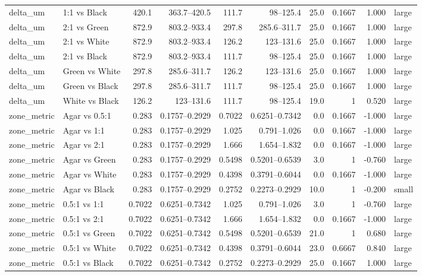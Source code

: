 \begin{longtable}{ll rr rr rrr l}
delta_um & 1:1 vs Black & 420.1 & 363.7–420.5 & 111.7 & 98–125.4 & 25.0 & 0.1667 & 1.000 & large \\
delta_um & 2:1 vs Green & 872.9 & 803.2–933.4 & 297.8 & 285.6–311.7 & 25.0 & 0.1667 & 1.000 & large \\
delta_um & 2:1 vs White & 872.9 & 803.2–933.4 & 126.2 & 123–131.6 & 25.0 & 0.1667 & 1.000 & large \\
delta_um & 2:1 vs Black & 872.9 & 803.2–933.4 & 111.7 & 98–125.4 & 25.0 & 0.1667 & 1.000 & large \\
delta_um & Green vs White & 297.8 & 285.6–311.7 & 126.2 & 123–131.6 & 25.0 & 0.1667 & 1.000 & large \\
delta_um & Green vs Black & 297.8 & 285.6–311.7 & 111.7 & 98–125.4 & 25.0 & 0.1667 & 1.000 & large \\
delta_um & White vs Black & 126.2 & 123–131.6 & 111.7 & 98–125.4 & 19.0 & 1 & 0.520 & large \\
zone_metric & Agar vs 0.5:1 & 0.283 & 0.1757–0.2929 & 0.7022 & 0.6251–0.7342 & 0.0 & 0.1667 & -1.000 & large \\
zone_metric & Agar vs 1:1 & 0.283 & 0.1757–0.2929 & 1.025 & 0.791–1.026 & 0.0 & 0.1667 & -1.000 & large \\
zone_metric & Agar vs 2:1 & 0.283 & 0.1757–0.2929 & 1.666 & 1.654–1.832 & 0.0 & 0.1667 & -1.000 & large \\
zone_metric & Agar vs Green & 0.283 & 0.1757–0.2929 & 0.5498 & 0.5201–0.6539 & 3.0 & 1 & -0.760 & large \\
zone_metric & Agar vs White & 0.283 & 0.1757–0.2929 & 0.4398 & 0.3791–0.6044 & 0.0 & 0.1667 & -1.000 & large \\
zone_metric & Agar vs Black & 0.283 & 0.1757–0.2929 & 0.2752 & 0.2273–0.2929 & 10.0 & 1 & -0.200 & small \\
zone_metric & 0.5:1 vs 1:1 & 0.7022 & 0.6251–0.7342 & 1.025 & 0.791–1.026 & 3.0 & 1 & -0.760 & large \\
zone_metric & 0.5:1 vs 2:1 & 0.7022 & 0.6251–0.7342 & 1.666 & 1.654–1.832 & 0.0 & 0.1667 & -1.000 & large \\
zone_metric & 0.5:1 vs Green & 0.7022 & 0.6251–0.7342 & 0.5498 & 0.5201–0.6539 & 21.0 & 1 & 0.680 & large \\
zone_metric & 0.5:1 vs White & 0.7022 & 0.6251–0.7342 & 0.4398 & 0.3791–0.6044 & 23.0 & 0.6667 & 0.840 & large \\
zone_metric & 0.5:1 vs Black & 0.7022 & 0.6251–0.7342 & 0.2752 & 0.2273–0.2929 & 25.0 & 0.1667 & 1.000 & large \\

\end{longtable}
